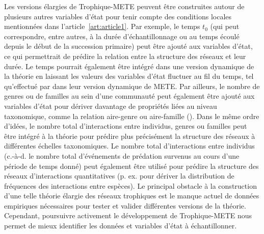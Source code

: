 Les versions élargies de Trophique-METE peuvent être construites autour de
plusieurs autres variables d'état pour tenir compte des conditions locales
mentionnées dans l'article~\ref{art:article1}. Par exemple, le temps $t_0$ (qui
peut correspondre, entre autres, à la durée d'échantillonnage ou au temps écoulé
depuis le début de la succession primaire) peut être ajouté aux variables
d'état, ce qui permettrait de prédire la relation entre la structure des réseaux
et leur durée. Le temps pourrait également être intégré dans une version
dynamique de la théorie en laissant les valeurs des variables d'état fluctuer au
fil du temps, tel qu'effectué par \textcite{Harte2021Dynamete} dans leur version
dynamique de METE. Par ailleurs, le nombre de genres ou de familles au sein
d'une communauté peut également être ajouté aux variables d'état pour dériver
davantage de propriétés liées au niveau taxonomique, comme la relation
aire-genre ou aire-famille (\cite{Harte2014Maximum}). Dans le même ordre
d'idées, le nombre total d'interactions entre individus, genres ou familles peut
être intégré à la théorie pour prédire plus précisément la structure des réseaux
à différentes échelles taxonomiques. Le nombre total d'interactions entre
individus (c.-à-d. le nombre total d'événements de prédation survenus au cours
d'une période de temps donné) peut également être utilisé pour prédire la
structure des réseaux d'interactions quantitatives (p. ex. pour dériver la
distribution de fréquences des interactions entre espèces). Le principal
obstacle à la construction d'une telle théorie élargie des réseaux trophiques
est le manque actuel de données empiriques nécessaires pour tester et valider
différentes versions de la théorie. Cependant, poursuivre activement le
développement de Trophique-METE nous permet de mieux identifier les données et
variables d'état à échantillonner. 

